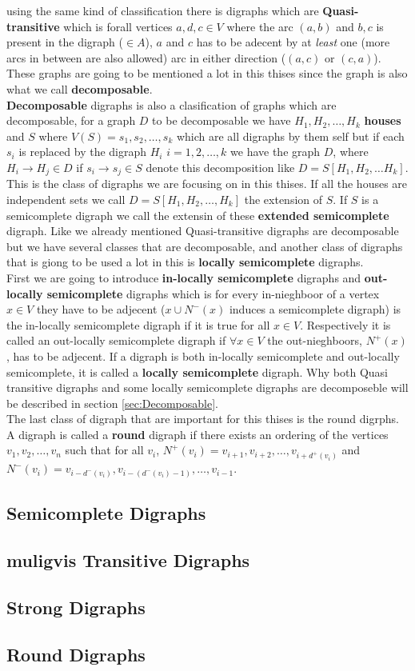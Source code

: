 using the same kind of classification there is digraphs which are \textbf{Quasi-transitive} which is forall vertices $a,d,c\in V$ where the arc $(a,b)$ and $b,c$ is present in the digraph ($\in A$), $a$ and $c$ has to be adecent by at \textit{least} one (more arcs in between are also allowed) arc in either direction ($(a,c)$ or $(c,a)$). These graphs are going to be mentioned a lot in this thises since the graph is also what we call \textbf{decomposable}.\\
\textbf{Decomposable} digraphs is also a clasification of graphs which are decomposable, for a graph $D$ to be decomposable we have $H_1,H_2, \dots , H_k$ \textbf{houses} and $S$ where $V(S)={s_1,s_2,\dots,s_k}$ which are all digraphs by them self but if each $s_i$ is replaced by the digraph $H_i$ $i=1,2,\dots,k$ we have the graph $D$, where $H_i\rightarrow H_j \in D$ if $s_i\rightarrow s_j\in S$  denote this decomposition like $D=S[H_1,H_2,\dots H_k]$.
This is the class of digraphs we are focusing on in this thises. 
If all the houses are independent sets we call $D=S[H_1,H_2,\dots ,H_k]$ the extension of $S$. 
If $S$ is a semicomplete digraph we call the extensin of these \textbf{extended semicomplete} digraph.
Like we already mentioned Quasi-transitive digraphs are decomposable but we have several classes that are decomposable, and another class of digraphs that is giong to be used a lot in this is \textbf{locally semicomplete} digraphs.\\
First we are going to introduce \textbf{in-locally semicomplete} digraphs and \textbf{out-locally semicomplete} digraphs which is for every in-nieghboor of a vertex $x\in V$ they have to be adjecent ($x\cup N^-(x)$ induces a semicomplete digraph) is the in-locally semicomplete digraph if it is true for all $x\in V$. 
Respectively it is called an out-locally semicomplete digraph if $\forall x\in V$ the out-nieghboors, $N^+(x)$, has to be adjecent. 
If a digraph is both in-locally semicomplete and out-locally semicomplete, it is called a \textbf{locally semicomplete} digraph. Why both Quasi transitive digraphs and some locally semicomplete digraphs are decomposeble will be described in section \autoref{sec:Decomposable}.\\
The last class of digraph that are important for this thises is the round digrphs. 
A digraph is called a \textbf{round} digraph if there exists an ordering of the vertices $v_1,v_2,\dots,v_n$ such that for all $v_i$, $N^+(v_i)={v_{i+1},v_{i+2},\dots ,v_{i+d^+(v_i)}}$ and $N^-(v_i)={v_{i-d^-(v_i)},v_{i-(d^-(v_i)-1)},\dots ,v_{i-1}}$.

\subsection{Semicomplete Digraphs}
\subsection{muligvis Transitive Digraphs}
\subsection{Strong Digraphs}
\subsection{Round Digraphs}



